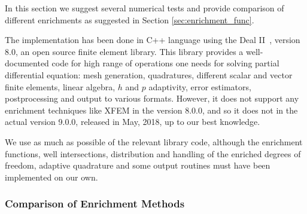 In this section we suggest several numerical tests and provide comparison of different enrichments
as suggested in Section \ref{sec:enrichment_func}.

The implementation has been done in C++ language using the Deal II~\cite{bangerth_deal.ii_2007}, version 8.0, 
an open source finite element library. This library provides a well-documented code for high range of operations one needs
for solving partial differential equation: mesh generation, quadratures, different scalar and vector finite elements,
linear algebra, $h$ and $p$ adaptivity, error estimators, postprocessing and output to various formats.
However, it does not support any enrichment techniques like XFEM in the version 8.0.0,
and so it does not in the actual version 9.0.0, released in May, 2018, up to our best knowledge.

We use as much as possible of the relevant library code, although the enrichment functions, well intersections,
distribution and handling of the enriched degrees of freedom, adaptive quadrature and some output routines
must have been implemented on our own.



\subsubsection{Comparison of Enrichment Methods} \label{sec:res_comparison}

